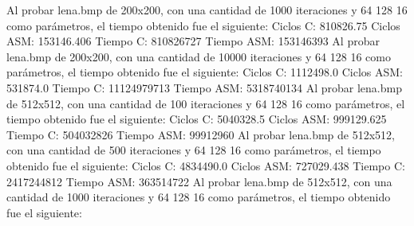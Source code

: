 \documentclass[10pt, a4paper]{article}
\begin{document}
\begin{itemize}
Al probar lena.bmp de 200x200, con una cantidad de 1000 iteraciones y 64 128 16 como parámetros, el tiempo obtenido fue el siguiente: \newline
Ciclos C:                 810826.75\newline
Ciclos ASM:               153146.406\newline
\newline
Tiempo C:                 810826727\newline
Tiempo ASM:               153146393\newline
\newline
Al probar lena.bmp de 200x200, con una cantidad de 10000 iteraciones y 64 128 16 como parámetros, el tiempo obtenido fue el siguiente: \newline
Ciclos C:                 1112498.0\newline
Ciclos ASM:               531874.0\newline
\newline
Tiempo C:                 11124979713\newline
Tiempo ASM:               5318740134\newline
\newline
Al probar lena.bmp de 512x512, con una cantidad de 100 iteraciones y 64 128 16 como parámetros, el tiempo obtenido fue el siguiente: \newline
Ciclos C:                 5040328.5\newline
Ciclos ASM:               999129.625\newline
\newline
Tiempo C:                 504032826\newline
Tiempo ASM:               99912960\newline
\newline
Al probar lena.bmp de 512x512, con una cantidad de 500 iteraciones y 64 128 16 como parámetros, el tiempo obtenido fue el siguiente: \newline
Ciclos C:                 4834490.0\newline
Ciclos ASM:               727029.438\newline
\newline
Tiempo C:                 2417244812\newline
Tiempo ASM:               363514722\newline
\newline
Al probar lena.bmp de 512x512, con una cantidad de 1000 iteraciones y 64 128 16 como parámetros, el tiempo obtenido fue el siguiente: \newline

\end{itemize}
\end{document}
